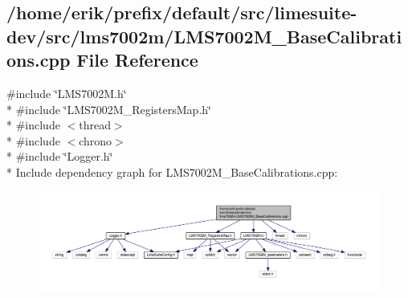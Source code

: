 \subsection{/home/erik/prefix/default/src/limesuite-\/dev/src/lms7002m/\+L\+M\+S7002\+M\+\_\+\+Base\+Calibrations.cpp File Reference}
\label{LMS7002M__BaseCalibrations_8cpp}
{\ttfamily \#include \char`\"{}L\+M\+S7002\+M.\+h\char`\"{}}\\*
{\ttfamily \#include \char`\"{}L\+M\+S7002\+M\+\_\+\+Registers\+Map.\+h\char`\"{}}\\*
{\ttfamily \#include $<$thread$>$}\\*
{\ttfamily \#include $<$chrono$>$}\\*
{\ttfamily \#include \char`\"{}Logger.\+h\char`\"{}}\\*
Include dependency graph for L\+M\+S7002\+M\+\_\+\+Base\+Calibrations.\+cpp\+:
\nopagebreak
\begin{figure}[H]
\begin{center}
\leavevmode
\includegraphics[width=350pt]{db/d1f/LMS7002M__BaseCalibrations_8cpp__incl}
\end{center}
\end{figure}
